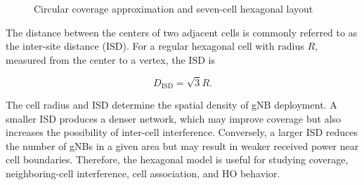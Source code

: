 \begin{figure}[H]
\centering
{}
\caption{Circular coverage approximation and seven-cell hexagonal layout}
\label{fig:hexagonal-cellular-layout}
\end{figure}

The distance between the centers of two adjacent cells is commonly referred to as the inter-site distance (ISD). For a regular hexagonal cell with radius \(R\), measured from the center to a vertex, the ISD is

\begin{equation}
    D_{\mathrm{ISD}} = \sqrt{3}R.
\end{equation}

The cell radius and ISD determine the spatial density of gNB deployment. A smaller ISD produces a denser network, which may improve coverage but also increases the possibility of inter-cell interference. Conversely, a larger ISD reduces the number of gNBs in a given area but may result in weaker received power near cell boundaries. Therefore, the hexagonal model is useful for studying coverage, neighboring-cell interference, cell association, and HO behavior.


